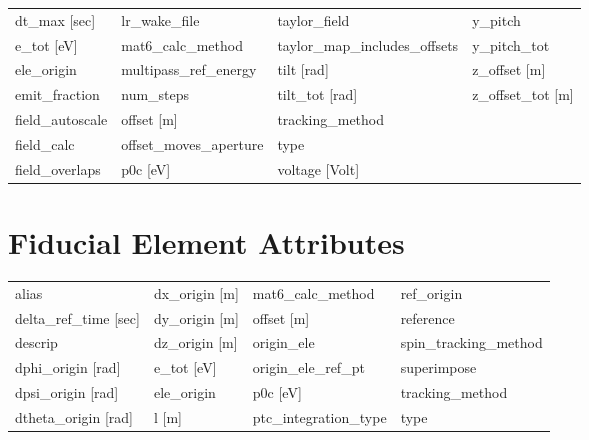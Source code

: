 \begin{tabular}{llll}
dt_max [sec]                     & lr_wake_file                     & taylor_field                     & y_pitch                          \\
e_tot [eV]                       & mat6_calc_method                 & taylor_map_includes_offsets      & y_pitch_tot                      \\
ele_origin                       & multipass_ref_energy             & tilt [rad]                       & z_offset [m]                     \\
emit_fraction                    & num_steps                        & tilt_tot [rad]                   & z_offset_tot [m]                 \\
field_autoscale                  & offset [m]                       & tracking_method                  &                                  \\
field_calc                       & offset_moves_aperture            & type                             &                                  \\
field_overlaps                   & p0c [eV]                         & voltage [Volt]                   &                                  \\
 \bottomrule
 \end{tabular}
 \vfill
 
 \section{Fiducial Element Attributes}
 \label{s:list.fiducial}
 
 \begin{tabular}{llll} \toprule
alias                            & dx_origin [m]                    & mat6_calc_method                 & ref_origin                       \\
delta_ref_time [sec]             & dy_origin [m]                    & offset [m]                       & reference                        \\
descrip                          & dz_origin [m]                    & origin_ele                       & spin_tracking_method             \\
dphi_origin [rad]                & e_tot [eV]                       & origin_ele_ref_pt                & superimpose                      \\
dpsi_origin [rad]                & ele_origin                       & p0c [eV]                         & tracking_method                  \\
dtheta_origin [rad]              & l [m]                            & ptc_integration_type             & type                             \\
 \bottomrule
 \end{tabular}
 \vfill
 
